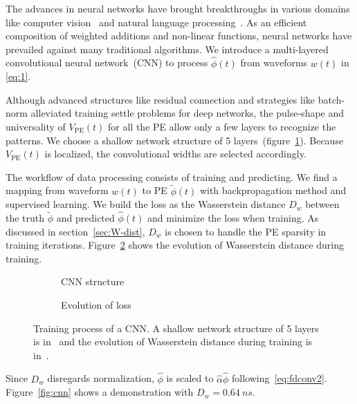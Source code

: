 The advances in neural networks have brought breakthroughs in various domains like computer vision~\cite{he_deep_2015} and natural language processing~\cite{vaswani_attention_2017}. As an efficient composition of weighted additions and non-linear functions, neural networks have prevailed against many traditional algorithms. We introduce a multi-layered convolutional neural network~(CNN) to process $\hat{\phi}(t)$ from waveforms $w(t)$ in \eqref{eq:1}. 

Although advanced structures like residual connection and strategies like batch-norm alleviated training settle problems for deep networks, the pulse-shape and universality of $V_\mathrm{PE}(t)$ for all the PE allow only a few layers to recognize the patterns. We choose a shallow network structure of 5 layers~(figure~\ref{fig:struct}). Because $V_\mathrm{PE}(t)$ is localized, the convolutional widths are selected accordingly. 

The workflow of data processing consists of training and predicting. We find a mapping from waveform $w(t)$ to PE $\tilde{\phi}(t)$ with backpropagation method and supervised learning. We build the loss as the Wasserstein distance $D_w$ between the truth $\tilde{\phi}$ and predicted $\hat{\phi}(t)$ and minimize the loss when training. As discussed in section~\ref{sec:W-dist}, $D_w$ is chosen to handle the PE sparsity in training iterations. Figure~\ref{fig:loss} shows the evolution of Wasserstein distance during training. 

\begin{figure}[H]
  \begin{subfigure}{0.35\textwidth}
    \centering
    \begin{adjustbox}{width=0.65\textwidth}
      
    \end{adjustbox}
    \caption{\label{fig:struct} CNN structure}
  \end{subfigure}
  \begin{subfigure}{0.6\textwidth}
    \centering
    \resizebox{\textwidth}{!}{}
    \caption{\label{fig:loss} Evolution of loss}
  \end{subfigure}
  \caption{\label{fig:CNN} Training process of a CNN. A shallow network structure of 5 layers is in~ and the evolution of Wasserstein distance during training is in~.}
\end{figure}

Since $D_w$ disregards normalization, $\hat{\phi}$ is scaled to $\hat{\alpha}\hat{\phi}$ following~\eqref{eq:fdconv2}. Figure~\ref{fig:cnn} shows a demonstration with $D_w = \SI{0.64}{ns}$. 


